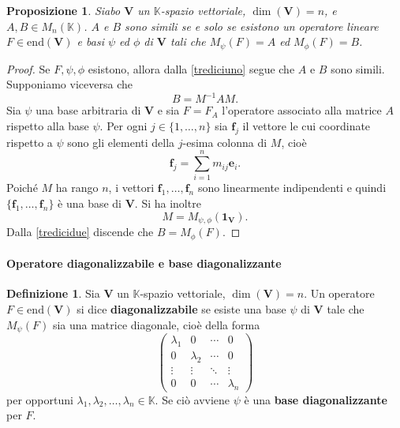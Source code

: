 \documentclass{article}
\theoremstyle{plain}
\newtheorem{prop}[thm]{Proposizione}
\theoremstyle{definition}
\newtheorem{defn}{Definizione}[section]
\theoremstyle{remark}
\begin{document}
\begin{bxthm}
\begin{prop}
Siabo \( \mathbf{V} \) un \( \mathbb{K} \)-spazio vettoriale, \( \dim(\mathbf{V}) = n \), e \( A, B \in M_n(\mathbb{K}) \). 
\( A \) e \( B \) sono simili se e solo se esistono un operatore lineare \( F \in \mathrm{end}(\mathbf{V}) \) e basi \( \psi \) ed \( \phi \) di \( \mathbf{V} \) tali che \( M_\psi(F) = A \) ed \( M_\phi(F) = B \).    
\end{prop}
\end{bxthm}
\begin{proof}
Se \( F, \psi,\phi \) esistono, allora dalla \ref{trediciuno} segue che \( A \) e \( B \) sono simili. 
Supponiamo viceversa che
\begin{equation}\label{tredicidue}
B = M^{-1} A M.    
\end{equation}
Sia \( \psi \) una base arbitraria di \( \mathbf{V} \) e sia \( F = F_A \) l'operatore associato alla matrice \( A \) 
rispetto alla base \( \psi \). Per ogni \( j \in \{1, \ldots, n\} \) sia \( \mathbf{f}_j \) il vettore le cui coordinate rispetto a 
\( \psi \) sono gli elementi della \( j \)-esima colonna di \( M \), cioè 
\[\mathbf{f}_j = \sum_{i=1}^{n}m_{ij}\mathbf{e}_i.\]
Poiché \( M \) ha rango \( n \), i vettori \( \mathbf{f}_1, \ldots, \mathbf{f}_n \) sono linearmente indipendenti 
e quindi \( \{\mathbf{f}_1, \ldots, \mathbf{f}_n\} \) è una base di \( \mathbf{V} \). 
Si ha inoltre
\[
M = M_{\psi,\phi}(\mathbf{1_V}).
\]
Dalla \ref{tredicidue} discende che \( B = M_\phi(F) \).    
\end{proof}

\vspace{10pt}

\paragraph{Operatore diagonalizzabile e base diagonalizzante}
\begin{bxthm}
\begin{defn}
Sia \( \mathbf{V} \) un \( \mathbb{K} \)-spazio vettoriale, \( \dim(\mathbf{V}) = n \). 
Un operatore \( F \in \mathrm{end}(\mathbf{V}) \) si dice \textbf{diagonalizzabile} se esiste una base \( \psi \) 
di \( \mathbf{V} \) tale che \( M_\psi(F) \) sia una matrice diagonale, cioè della forma
\[
\begin{pmatrix}
\lambda_1 & 0 & \cdots & 0 \\
0 & \lambda_2 & \cdots & 0 \\
\vdots & \vdots & \ddots & \vdots \\
0 & 0 & \cdots & \lambda_n
\end{pmatrix}
\]
per opportuni \( \lambda_1, \lambda_2, \ldots, \lambda_n \in \mathbb{K} \). 
Se ciò avviene \( \psi \) è una \textbf{base diagonalizzante} per \( F \).    
\end{defn}
\end{bxthm}
\end{document}
